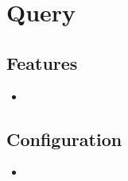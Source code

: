 \section{Query}
\label{module:Query}
\ClearAPI
\TODO
\subsection{Features}
\begin{itemize}
	\item \TODO
\end{itemize}

\subsection{Configuration}
\begin{itemize}
	\item {}
\end{itemize}
